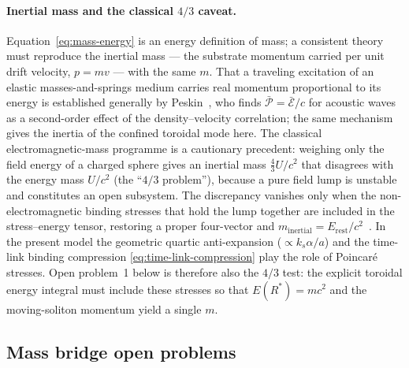 \paragraph{Inertial mass and the classical $4/3$ caveat.}
Equation~\eqref{eq:mass-energy} is an energy definition of mass; a consistent theory must
reproduce the inertial mass --- the substrate momentum carried per unit drift velocity,
$p=mv$ --- with the same $m$.
That a traveling excitation of an elastic masses-and-springs medium carries real momentum
proportional to its energy is established generally by Peskin~\citep{Peskin2010}, who finds
$\bar{\mathcal{P}}=\bar{\mathcal{E}}/c$ for acoustic waves as a second-order effect of the
density--velocity correlation; the same mechanism gives the inertia of the confined toroidal
mode here.
The classical electromagnetic-mass programme is a cautionary precedent: weighing only the field
energy of a charged sphere gives an inertial mass $\tfrac{4}{3}U/c^2$ that disagrees with the
energy mass $U/c^2$ (the ``$4/3$ problem''), because a pure field lump is unstable and constitutes
an open subsystem.
The discrepancy vanishes only when the non-electromagnetic binding stresses that hold the lump
together are included in the stress--energy tensor, restoring a proper four-vector and
$m_{\mathrm{inertial}}=E_{\mathrm{rest}}/c^2$~\citep{Poincare1900,Einstein1905inertia,Hecht2009,Brown2007}.
In the present model the geometric quartic anti-expansion ($\propto k_s\alpha/a$) and the time-link
binding compression \eqref{eq:time-link-compression} play the role of Poincar\'{e} stresses.
Open problem~1 below is therefore also the $4/3$ test: the explicit toroidal energy integral must
include these stresses so that $E(R^*)=mc^2$ and the moving-soliton momentum yield a single $m$.

\subsection{Mass bridge open problems}
\label{subsec:mass-open}

